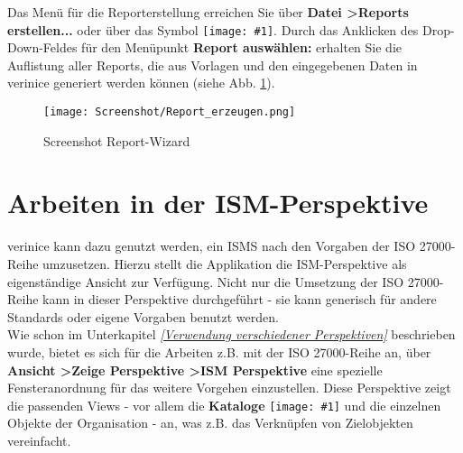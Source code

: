 \documentclass[a4paper,10pt]{book}
\newcommand{\icon}[1]{\texttt{[image: \#1]}}
\begin{document}
Das Menü für die Reporterstellung erreichen Sie über \textbf{Datei
  \textgreater Reports erstellen...} oder über das Symbol
\icon{Icon/Report.png}. Durch das Anklicken des
Drop-Down-Feldes für den Menüpunkt \textbf{Report auswählen:} erhalten
Sie die Auflistung aller Reports, die aus Vorlagen und den
eingegebenen Daten in verinice generiert werden können (siehe
Abb. \ref{fig:report-wizard}).

\begin{figure}[htb!]
  \centering
  \texttt{[image: Screenshot/Report\_erzeugen.png]}
  \caption{Screenshot Report-Wizard}
  \label{fig:report-wizard}
\end{figure}

\chapter{Arbeiten in der ISM-Perspektive}\label{Arbeiten in der ISM-Perspektive}
verinice kann dazu genutzt werden, ein ISMS nach den Vorgaben der ISO 27000-Reihe umzusetzen. Hierzu stellt die Applikation
die ISM-Perspektive als eigenständige Ansicht zur Verfügung. Nicht nur die Umsetzung der ISO 27000-Reihe kann in dieser Perspektive
durchgeführt - sie kann generisch für andere Standards oder eigene Vorgaben benutzt werden.
\newline\\
Wie schon im Unterkapitel {\em \ref{Verwendung verschiedener Perspektiven} } beschrieben wurde, bietet es sich für die Arbeiten z.B. mit der
ISO 27000-Reihe an, über \textbf{Ansicht \textgreater Zeige Perspektive \textgreater ISM Perspektive }eine spezielle
Fensteranordnung für das weitere Vorgehen einzustellen. Diese Perspektive zeigt die passenden Views  - vor allem die
\textbf{Kataloge} \icon{Icon/bp_catalog} und die einzelnen Objekte der Organisation - an,
was z.B. das Verknüpfen von Zielobjekten vereinfacht.
\end{document}

